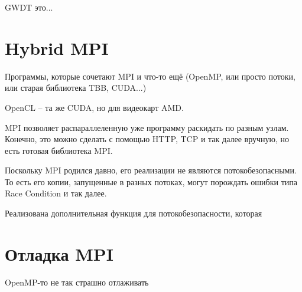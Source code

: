 \documentclass[main.tex]{subfiles}
\begin{document}
GWDT это...

\section{Hybrid MPI}

Программы, которые сочетают MPI и что-то ещё (OpenMP, или просто потоки, или старая библиотека TBB, CUDA...)

OpenCL -- та же CUDA, но для видеокарт AMD.

MPI позволяет распараллеленную уже программу раскидать по разным узлам.
Конечно, это можно сделать с помощью HTTP, TCP и так далее вручную, но есть готовая библиотека MPI.

Поскольку MPI родился давно, его реализации не являются потокобезопасными.
То есть его копии, запущенные в разных потоках, могут порождать ошибки типа  Race Condition и так далее.

Реализована дополнительная функция для потокобезопасности, которая 

\section{Отладка MPI}

\begin{leftbar}
	OpenMP-то не так страшно отлаживать
\end{leftbar}
\end{document}
